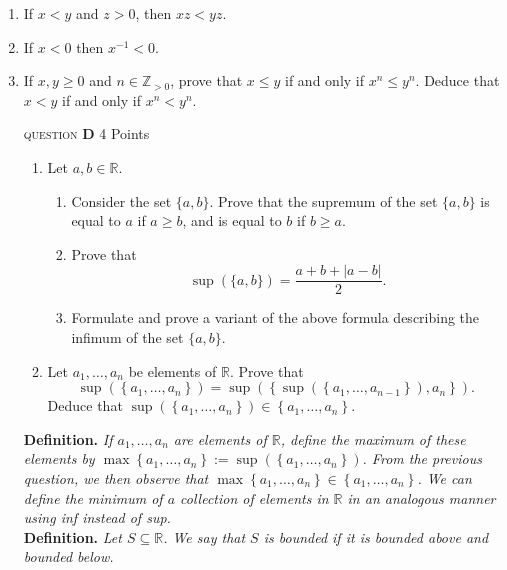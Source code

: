 \documentclass[11pt]{article}
\newcommand{\problem
}[2]{
\begin{mdframed}
    \textsc{question} \textbf{#1} \hfill #2
\end{mdframed}
}
\begin{document}
\begin{enumerate}
	\item If $x<y$ and $z>0$, then $x z<y z$.
	\item If $x<0$ then $x^{-1}<0$.
	\item If $x, y \geq 0$ and $n \in \mathbb{Z}_{>0}$, prove that $x \leq y$ if and only if $x^n \leq y^n$. Deduce that $x<y$ if and only if $x^n<y^n$.

	      \problem{D}{4 Points}
	      \begin{enumerate}
		      \item Let $a, b \in \mathbb{R}$.
		            \begin{enumerate}
			            \item Consider the set $\{a, b\}$. Prove that the supremum of the set $\{a, b\}$ is equal to $a$ if $a \geq b$, and is equal to $b$ if $b \geq a$.
			            \item Prove that
			                  $$
				                  \sup (\{a, b\})=\frac{a+b+|a-b|}{2} .
			                  $$
			            \item  Formulate and prove a variant of the above formula describing the infimum of the set $\{a, b\}$.

		            \end{enumerate}

		      \item Let $a_1, \ldots, a_n$ be elements of $\mathbb{R}$. Prove that
		            $$ \sup \left(\left\{a_1, \ldots, a_n\right\}\right)=\sup \left(\left\{\sup \left(\left\{a_1, \ldots, a_{n-1}\right\}\right), a_n\right\}\right) . $$
		            Deduce that $\sup \left(\left\{a_1, \ldots, a_n\right\}\right) \in\left\{a_1, \ldots, a_n\right\}$.
	      \end{enumerate}



	      \textbf{Definition.} \emph{If $a_1, \ldots, a_n$ are elements of $\mathbb{R}$, define the maximum of these elements by $\max \left\{a_1, \ldots, a_n\right\}:=\sup \left(\left\{a_1, \ldots, a_n\right\}\right)$. From the previous question, we then observe that $\max \left\{a_1, \ldots, a_n\right\} \in\left\{a_1, \ldots, a_n\right\}$. We can define the minimum of $a$ collection of elements in $\mathbb{R}$ in an analogous manner using inf instead of sup.}
	      \\

	      \textbf{Definition.} \emph{Let $S \subseteq \mathbb{R}$. We say that $S$ is bounded if it is bounded above and bounded below.}


\end{enumerate}
\end{document}
